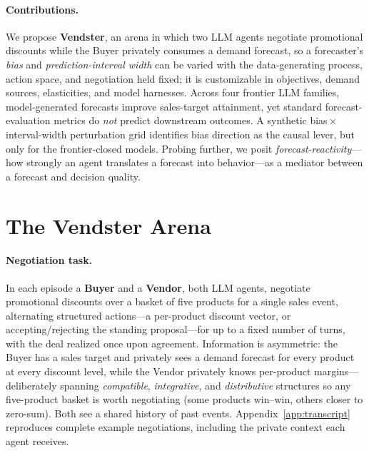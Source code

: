 \documentclass{article}
\begin{document}
\paragraph{Contributions.}
We propose \textbf{Vendster}, an arena in which two LLM agents negotiate promotional discounts while the Buyer privately consumes a demand forecast, so a forecaster's \emph{bias} and \emph{prediction-interval width} can be varied with the data-generating process, action space, and negotiation held fixed; it is customizable in objectives, demand sources, elasticities, and model harnesses. Across four frontier LLM families, model-generated forecasts improve sales-target attainment, yet standard forecast-evaluation metrics do \emph{not} predict downstream outcomes. A synthetic bias\,$\times$\,interval-width perturbation grid identifies bias direction as the causal lever, but only for the frontier-closed models. Probing further, we posit \emph{forecast-reactivity}---how strongly an agent translates a forecast into behavior---as a mediator between a forecast and decision quality.

\section{The Vendster Arena}

\paragraph{Negotiation task.} In each episode a \textbf{Buyer} and a \textbf{Vendor}, both LLM agents, negotiate promotional discounts over a basket of five products for a single sales event, alternating structured actions---a per-product discount vector, or accepting/rejecting the standing proposal---for up to a fixed number of turns, with the deal realized once upon agreement. Information is asymmetric: the Buyer has a sales target and privately sees a demand forecast for every product at every discount level, while the Vendor privately knows per-product margins---deliberately spanning \emph{compatible}, \emph{integrative}, and \emph{distributive} structures so any five-product basket is worth negotiating (some products win--win, others closer to zero-sum). Both see a shared history of past events. Appendix~\ref{app:transcript} reproduces complete example negotiations, including the private context each agent receives.
\end{document}

